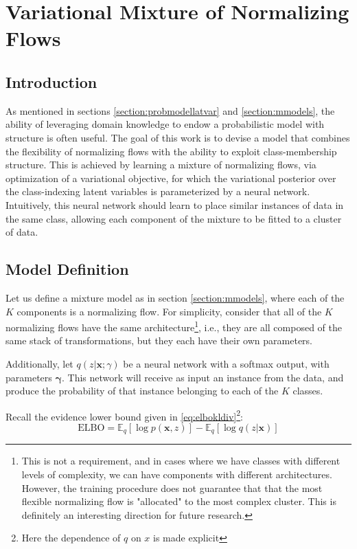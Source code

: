 \chapter{Variational Mixture of Normalizing Flows}
\label{chapter:vmonf}

\section{Introduction}
\label{section:vmonf-intro}

As mentioned in sections \ref{section:probmodellatvar} and \ref{section:mmodels},
the ability of leveraging domain knowledge to endow a probabilistic model with
structure is often useful. The goal of this work is to devise a model that combines
the flexibility of normalizing flows with the ability to exploit class-membership
structure. This is achieved by learning a mixture of normalizing flows, via
optimization of a variational objective, for which the variational posterior
over the class-indexing latent variables is parameterized by a neural network.
Intuitively, this neural network should learn to place similar instances of
data in the same class, allowing each component of the mixture to be fitted
to a cluster of data.

\section{Model Definition}

Let us define a mixture model as in section \ref{section:mmodels}, where each of
the $K$ components is a normalizing flow. For simplicity, consider that all of
the $K$ normalizing flows have the same architecture\footnote{This is not a requirement,
and in cases where we have classes with different levels of complexity, we can
have components with different architectures. However, the training procedure
does not guarantee that that the most flexible normalizing flow is "allocated"
to the most complex cluster. This is definitely an interesting direction for future
research.}, i.e., they are all composed of the same stack of transformations,
but they each have their own parameters.

Additionally, let $q(z|\bm{x};\gamma)$ be a neural network with a softmax output, with
parameters $\bm\gamma$. This network will receive as input an instance from the
data, and produce the probability of that instance belonging to each of the
$K$ classes.

Recall the evidence lower bound given in \ref{eq:elbokldiv}\footnote{Here the
dependence of $q$ on $x$ is made explicit}:
\begin{equation*}
    \text{ELBO} = \mathbb{E}_q [\log p(\bm{x}, z)] - \mathbb{E}_q [\log q(z|\bm{x})]
\end{equation*}

